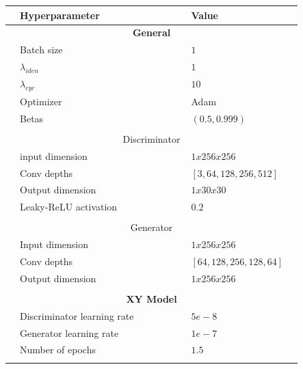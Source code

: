 \documentclass[12pt, fleqn, titlepage]{article}
\begin{document}
\begin{table}[H]
	\centering
	\begin{tabular}{l l l l l l l l l}
		\toprule
		& \textbf{Hyperparameter}     &&&&& & \textbf{Value}   & \\ \midrule
		& \multicolumn{7}{c}{\textbf{General}}              & \\
		& Batch size                  &&&&& & $1$           & \\
		& $\lambda_{iden}$            &&&&& & $1$           & \\
		& $\lambda_{cyc}$             &&&&& & $10$          & \\
		& Optimizer                   &&&&& & Adam          & \\
		& Betas                       &&&&& & $(0.5, 0.999)$& \\
		&                             &&&&& &               & \\
		& \multicolumn{7}{c}{Discriminator}                 & \\
		& input dimension             &&&&& & $1x256x256$   & \\
		& Conv depths                 &&&&& & $\left[3, 64, 128, 256, 512\right]$& \\
		& Output dimension            &&&&& & $1x30x30$     & \\
		& Leaky-ReLU activation       &&&&& & $0.2$         & \\
		&                             &&&&& &               & \\
		& \multicolumn{7}{c}{Generator}                     & \\
		& Input dimension             &&&&& & $1x256x256$   & \\
		& Conv depths                 &&&&& & $\left[64, 128, 256, 128, 64\right]$              & \\
		& Output dimension            &&&&& & $1x256x256$   & \\
		&                             &&&&& &               & \\ 
		& \multicolumn{7}{c}{\textbf{XY Model}}             & \\
		& Discriminator learning rate &&&&& & $5e-8$        & \\
		& Generator learning rate     &&&&& & $1e-7$        & \\
		& Number of epochs            &&&&& & $1.5$         & \\
		&                             &&&&& &               & \\

\end{tabular}
\end{table}
\end{document}
